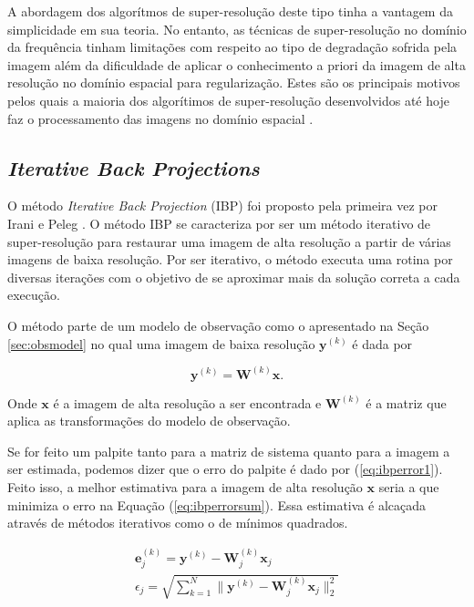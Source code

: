 A abordagem dos algorítmos de super-resolução deste tipo tinha a vantagem da simplicidade em sua teoria.
No entanto, as técnicas de super-resolução no domínio da frequência tinham limitações com respeito ao tipo de degradação sofrida pela imagem além da dificuldade de aplicar o conhecimento a priori da imagem de alta resolução no domínio espacial para regularização.
Estes são os principais motivos pelos quais a maioria dos algorítimos de super-resolução desenvolvidos até hoje faz o processamento das imagens no domínio espacial \cite{park2003super}.

\subsection{\emph{Iterative Back Projections}}
O método \emph{Iterative Back Projection} (IBP) foi proposto pela primeira vez por Irani e Peleg \cite{irani1991improv}.
O método IBP se caracteriza por ser um método iterativo de super-resolução para restaurar uma imagem de alta resolução a partir de várias imagens de baixa resolução.
Por ser iterativo, o método executa uma rotina por diversas iterações com o objetivo de se aproximar mais da solução correta a cada execução.

O método parte de um modelo de observação como o apresentado na Seção \ref{sec:obsmodel} no qual uma imagem de baixa resolução $\mathbf{y}^{(k)}$ é dada por

\begin{equation}
	\mathbf{y}^{(k)} = \mathbf{W}^{(k)} \mathbf{x}.
\end{equation}

Onde $\mathbf{x}$ é a imagem de alta resolução a ser encontrada e $\mathbf{W}^{(k)}$ é a matriz que aplica as transformações do modelo de observação.

Se for feito um palpite tanto para a matriz de sistema quanto para a imagem a ser estimada, podemos dizer que o erro do palpite é dado por (\ref{eq:ibperror1}).
Feito isso, a melhor estimativa para a imagem de alta resolução $\mathbf{x}$ seria a que minimiza o erro na Equação (\ref{eq:ibperrorsum}).
Essa estimativa é alcaçada através de métodos iterativos como o de mínimos quadrados.

\begin{gather}
	\label{eq:ibperror1} \mathbf{e}^{(k)}_j = \mathbf{y}^{(k)}-\mathbf{W}^{(k)}_j \mathbf{x}_j \\
	\label{eq:ibperrorsum} \epsilon_j = \sqrt{\sum^N_{k=1}{\|\mathbf{y}^{(k)}-\mathbf{W}^{(k)}_j \mathbf{x}_j\|^2_2}}
\end{gather}

